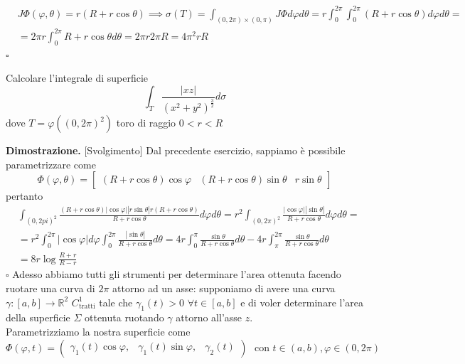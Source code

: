 	\[\begin{aligned}
	&J\Phi(\varphi, \theta) = r(R + r\cos{\theta}) \implies \sigma(T) = \int_{(0, 2\pi) \times (0, \pi)} J\Phi d\varphi d\theta = r \int_0^{2\pi} \int_0^{2\pi} (R + r\cos{\theta}) d\varphi d\theta = \\
	&= 2\pi r \int_0^{2\pi} R + r\cos{\theta} d\theta = 2 \pi r 2 \pi R = 4 \pi^2 rR
	\end{aligned}\]
\hfill $\square$
%
\vspace{0.5cm}
\begin{exercise}
	Calcolare l'integrale di superficie
	$$
	\int_T \frac{|xz|}{(x^2 + y^2)^{\frac{3}{2}}} d\sigma
	$$
	dove $T=\varphi((0, 2\pi)^2)$ toro di raggio  $0 < r < R$
	
\end{exercise}
%
\noindent \textbf{Dimostrazione. }[Svolgimento]
Dal precedente esercizio, sappiamo è possibile parametrizzare come
	$$
	\Phi(\varphi, \theta) = \begin{bmatrix}	(R + r\cos{\theta})\cos{\varphi} & (R + r\cos{\theta})\sin{\theta} & r \sin{\theta}	\end{bmatrix}
	$$
	pertanto
	\[\begin{aligned}
	&\int_{(0, 2pi)^2} \frac{(R+r\cos{\theta}) |\cos{\varphi}||r\sin{\theta}|r(R+r\cos{\theta})}{R+r\cos{\theta}}d\varphi d\theta = r^2 \int_{(0,2\pi)^2} \frac{|\cos{\varphi}| |\sin{\theta}|}{R + r\cos{\theta}} d\varphi d\theta = & \\
	&= r^2 \int_0^{2\pi} |\cos{\varphi}|d\varphi \int_0^{2 \pi} \frac{|\sin{\theta}|}{R + r\cos{\theta}} d\theta = 4r \int_0^\pi \frac{\sin{\theta}}{R + r\cos{\theta}}d\theta - 4r \int_\pi^{2\pi} \frac{\sin{\theta}}{R + r\cos{\theta}}d\theta & \\
	&= 8r\log{\frac{R+r}{R-r}}
	\end{aligned}\]
\hfill $\square$
%
Adesso abbiamo tutti gli strumenti per determinare l'area ottenuta facendo ruotare una curva di $2\pi$ attorno ad un asse: supponiamo di avere una curva $\gamma: [a, b] \to \mathbb{R}^2$ $C^1_\text{tratti}$ tale che $\gamma_1(t) > 0 \, \, \forall t \in [a, b]$ e di voler
determinare l'area della superficie $\Sigma$ ottenuta ruotando $\gamma$ attorno all'asse $z$. \\
Parametrizziamo la nostra superficie come
$$
\Phi(\varphi, t) = \begin{pmatrix}
	\gamma_1(t) \cos{\varphi}, & \gamma_1(t) \sin{\varphi}, & \gamma_2(t)
\end{pmatrix} \, \, \text{ con } t \in (a, b), \varphi \in (0, 2\pi) 
$$
